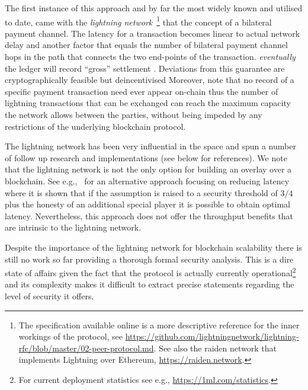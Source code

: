 The first instance of this approach and by far the most widely known and
utilised to date, came with the \emph{lightning
network}~\cite{lightning}\footnote{The specification available online is a more
descriptive reference for the inner workings of the protocol, see
\url{https://github.com/lightningnetwork/lightning-rfc/blob/master/02-peer-protocol.md}.
See also the raiden network that implements Lightning over Ethereum,
\url{https://raiden.network}.} that  the concept of a bilateral payment channel. The
latency for a transaction becomes linear to actual network delay and another
factor that equals the number of bilateral payment channel hops in the path that
connects the two end-points of the transaction.  \emph{eventually} the ledger will record
 ``gross'' settlement . Deviations from this guarantee are
cryptographically feasible but deincentivised Moreover, note that no record of a specific payment
transaction need ever appear on-chain thus the number of lightning transactions
that can be exchanged can reach the maximum capacity the network allows between
the parties, without being impeded by any restrictions of the underlying
blockchain protocol.

The lightning network has been very influential in the space and spun a number
of follow up research and implementations (see below for references). We note
that the lightning network is not the only option for building an overlay over a
blockchain. See e.g.,~\cite{DBLP:conf/eurocrypt/PassS18} for an alternative
approach focusing on reducing latency\redden{,} where it is shown that if the
assumption is raised to a security threshold of $3/4$ plus the honesty of an
additional special player\redden{,} it is possible to obtain optimal latency.
Nevertheless, this approach does not offer the throughput benefits that are
intrinsic to the lightning network.

Despite the importance of the lightning network for blockchain scalability there
is still no work so far providing a thorough formal security analysis. This is a
dire state of affairs given the fact that the protocol is actually currently
operational\footnote{For current deployment statistics see e.g.,
\url{https://1ml.com/statistics}.} and its complexity makes it difficult to
extract precise statements regarding the level of security it offers.

